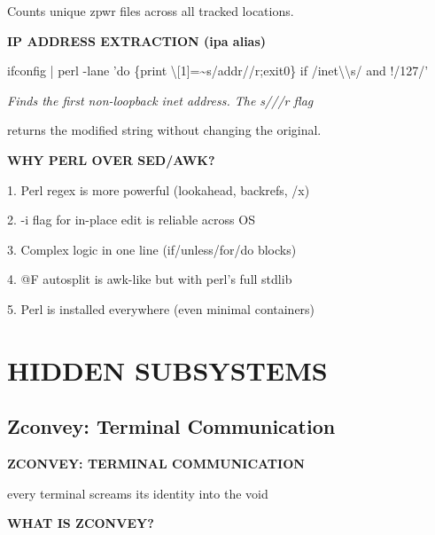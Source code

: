 \documentclass[11pt,a4paper,twoside]{book}
\begin{document}
Counts unique zpwr files across all tracked locations.


\vspace{12pt}
{\bfseries\color{neonyellow} IP ADDRESS EXTRACTION (ipa alias)}\vspace{4pt}

\begin{codebox}
ifconfig | perl -lane 'do \{print \textbackslash{}[1]=\textasciitilde{}s/addr//r;exit0\} if /inet\textbackslash{}\textbackslash{}s/ and !/127/'\\
\end{codebox}

{\small\itshape\color{dimtext} Finds the first non-loopback inet address. The s///r flag}

returns the modified string without changing the original.


\vspace{12pt}
{\bfseries\color{neonyellow} WHY PERL OVER SED/AWK?}\vspace{4pt}

1. Perl regex is more powerful (lookahead, backrefs, /x)

2. -i flag for in-place edit is reliable across OS

3. Complex logic in one line (if/unless/for/do blocks)

4. @F autosplit is awk-like but with perl's full stdlib

5. Perl is installed everywhere (even minimal containers)


\vspace{16pt}


\chapter{HIDDEN SUBSYSTEMS}

\section{Zconvey: Terminal Communication}


\vspace{10pt}
{\large\bfseries\color{neoncyan} ZCONVEY: TERMINAL COMMUNICATION}\vspace{6pt}

every terminal screams its identity into the void


\vspace{12pt}
{\bfseries\color{neonyellow} WHAT IS ZCONVEY?}\vspace{4pt}
\end{document}
